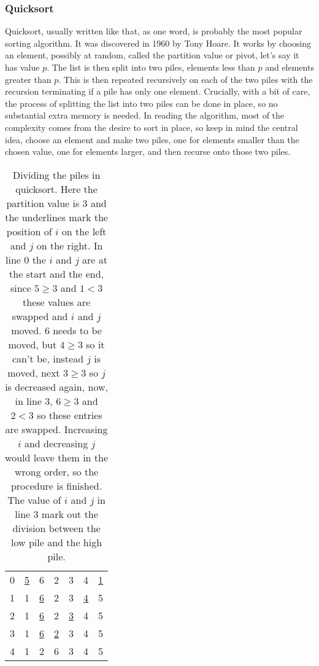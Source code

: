 \documentclass[11pt,a4paper]{scrartcl}
\begin{document}
\subsubsection*{Quicksort}

Quicksort, usually written like that, as one word, is probably the
most popular sorting algorithm. It was discovered in 1960 by Tony
Hoare. It works by choosing an element, possibly at random, called the
partition value or pivot, let's say it has value $p$. The list is then
split into two piles, elements less than $p$ and elements greater
than $p$. This is then repeated recursively on each of
the two piles with the recursion terminating if a pile has only one
element. Crucially, with a bit of care, the process of splitting the
list into two piles can be done in place, so no substantial extra
memory is needed. In reading the algorithm, most of the complexity
comes from the desire to sort in place, so keep in mind the central
idea, choose an element and make two piles, one for elements smaller
than the chosen value, one for elements larger, and then recurse onto
those two piles.

\begin{table}
\begin{tabular}{c|cccccc}
0&\underline{5}&6&2&3&4&\underline{1}\\
1&1&\underline{6}&2&3&\underline{4}&5\\
2&1&\underline{6}&2&\underline{3}&4&5\\
3&1&\underline{6}&\underline{2}&3&4&5\\
4&1&2&6&3&4&5\\
\end{tabular}
\caption{Dividing the piles in quicksort. Here the partition value is
  3 and the underlines mark the position of $i$ on the left and $j$ on
  the right. In line 0 the $i$ and $j$ are at the start and the end,
  since $5\ge 3$ and $1<3$ these values are swapped and $i$ and $j$
  moved. 6 needs to be moved, but $4\ge 3$ so it can't be, instead $j$
  is moved, next $3\ge 3$ so $j$ is decreased again, now, in line 3,
  $6\ge 3$ and $2<3$ so these entries are swapped. Increasing $i$ and
  decreasing $j$ would leave them in the wrong order, so the procedure
  is finished. The value of $i$ and $j$ in line 3 mark out the
  division between the low pile and the high
  pile.\label{table_quick_divide}}
\end{table}
\end{document}
